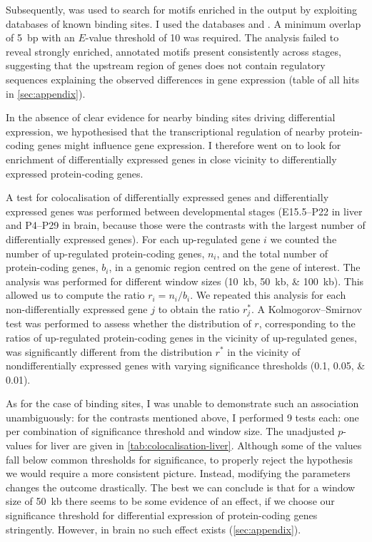 Subsequently,  \citep{Gupta:2007} was used to search for motifs
enriched in the  output by exploiting databases of known \tf binding
sites. I used the databases  and
. A minimum overlap of \SI{5}{bp} with an
\(E\)-value threshold of \num{10} was required. The analysis failed to reveal
strongly enriched, annotated motifs present consistently across stages,
suggesting that the upstream region of \trna genes does not contain regulatory
sequences explaining the observed differences in \trna gene expression (table of
all hits in \cref{sec:appendix}).

In the absence of clear evidence for nearby \tf binding sites driving
differential expression, we hypothesised that the transcriptional regulation of
nearby protein-coding genes might influence \trna gene expression. I therefore
went on to look for enrichment of differentially expressed \trna genes in close
vicinity to differentially expressed protein-coding genes.

A test for colocalisation of differentially expressed \trna genes and
differentially expressed \mrna genes was performed between developmental stages
(E15.5–P22 in liver and P4–P29 in brain, because those were the contrasts with
the largest number of differentially expressed \trna genes). For each
up-regulated \trna gene \(i\) we counted the number of up-regulated
protein-coding genes, \(n_i\), and the total number of protein-coding genes,
\(b_i\), in a genomic region centred on the \trna gene of interest. The analysis
was performed for different window sizes (\SIlist{10;50;100}{kb}). This allowed
us to compute the ratio \(r_i = {n_i}/{b_i}\). We repeated this analysis for
each non-differentially expressed \trna gene \(j\) to obtain the ratio
\(r_j^*\). A Kolmogorov–Smirnov test was performed to assess whether the
distribution of \(r\), corresponding to the ratios of up-regulated
protein-coding genes in the vicinity of up-regulated \trna genes, was
significantly different from the distribution \(r^*\) in the vicinity of
nondifferentially expressed \trna genes with varying significance thresholds
(\numlist{0.1;0.05;0.01}).

As for the case of \tf binding sites, I was unable to demonstrate such an
association unambiguously: for the contrasts mentioned above, I performed
\num{9} tests each: one per combination of significance threshold and window
size. The unadjusted \(p\)-values for liver are given in
\cref{tab:colocalisation-liver}. Although some of the values fall below common
thresholds for significance, to properly reject the hypothesis we would require
a more consistent picture. Instead, modifying the parameters changes the outcome
drastically. The best we can conclude is that for a window size of \SI{50}{kb}
there seems to be some evidence of an effect, if we choose our significance
threshold for differential expression of protein-coding genes stringently.
However, in brain no such effect exists (\cref{sec:appendix}).

